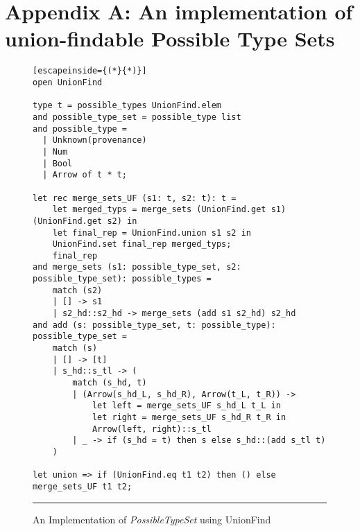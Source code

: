 \newpage
\section{Appendix A: An implementation of union-findable Possible Type Sets}

\begin{figure}[h!]
\begin{lstlisting}[escapeinside={(*}{*)}]
open UnionFind

type t = possible_types UnionFind.elem
and possible_type_set = possible_type list
and possible_type =
  | Unknown(provenance)
  | Num
  | Bool
  | Arrow of t * t;

let rec merge_sets_UF (s1: t, s2: t): t =
    let merged_typs = merge_sets (UnionFind.get s1) (UnionFind.get s2) in
    let final_rep = UnionFind.union s1 s2 in
    UnionFind.set final_rep merged_typs;
    final_rep
and merge_sets (s1: possible_type_set, s2: possible_type_set): possible_types = 
    match (s2)
    | [] -> s1
    | s2_hd::s2_hd -> merge_sets (add s1 s2_hd) s2_hd
and add (s: possible_type_set, t: possible_type): possible_type_set =
    match (s)
    | [] -> [t]
    | s_hd::s_tl -> (
        match (s_hd, t)
        | (Arrow(s_hd_L, s_hd_R), Arrow(t_L, t_R)) ->
            let left = merge_sets_UF s_hd_L t_L in
            let right = merge_sets_UF s_hd_R t_R in
            Arrow(left, right)::s_tl
        | _ -> if (s_hd = t) then s else s_hd::(add s_tl t)
    )

let union => if (UnionFind.eq t1 t2) then () else merge_sets_UF t1 t2;
\end{lstlisting}
\vspace{-4px}
 \hrule
\caption{An Implementation of \textit{PossibleTypeSet} using UnionFind}
\label{fig:ufalgcode}
\end{figure}